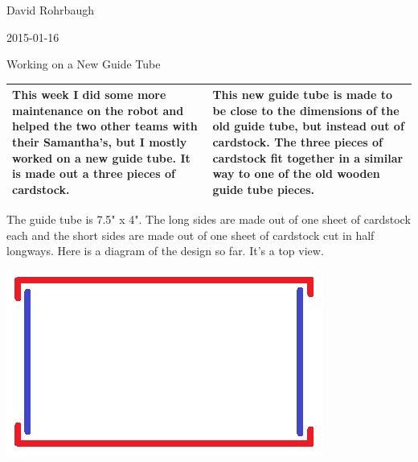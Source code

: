 David Rohrbaugh

2015-01-16

Working on a New Guide Tube

\begin{tabular}{|p{5cm}|p{5cm}|}
 \hline
 This week I did some more maintenance on the robot and helped the two other teams with their Samantha's, but I mostly worked on a new guide tube. It is made out a three pieces of cardstock.
 &
 This new guide tube is made to be close to the dimensions of the old guide tube, but instead out of cardstock. The three pieces of cardstock fit together in a similar way to one of the old wooden guide tube pieces.
 \\
 \hline
\end{tabular}

\medskip

The guide tube is 7.5" x 4". The long sides are made out of one sheet of cardstock each and the short sides are made out of one sheet of cardstock cut in half longways. Here is a diagram of the design so far. It's a top view.

\begin{center}
 \includegraphics{./Entries/Images/cardstock_guide_tube.png}
\end{center}